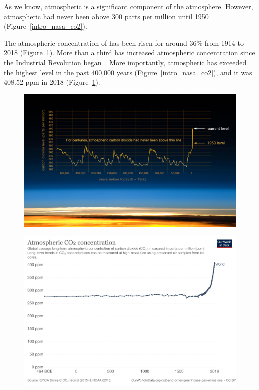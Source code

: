As we know, atmospheric  is a significant component of the atmosphere. However, atmospheric  had never been above 300 parts per million until 1950 (Figure~\ref{intro_nasa_co2}). 

The atmospheric concentration of  has been risen for around 36\% from 1914 to 2018 (Figure~\ref{intro_co2-concentration-long-term}).
More than a third has increased atmospheric  concentration since the Industrial Revolution began~\cite{epic337530}. More importantly, atmospheric  has exceeded the highest level in the past 400,000 years (Figure~\ref{intro_nasa_co2}), and it was 408.52 ppm in 2018 (Figure~\ref{intro_co2-concentration-long-term}).


\begin{figure}
\center
\includegraphics[scale=0.28]{img/intro_nasa_co2.jpeg}

\includegraphics[scale=0.12]{img/intro_co2-concentration-long-term.png}
\label{intro_co2-concentration-long-term}
\end{figure}




